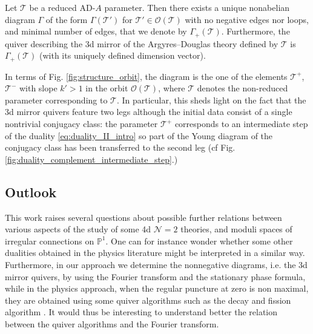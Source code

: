 \documentclass[11pt,a4paper]{amsart}
\numberwithin{equation}{section}
\begin{document}
\begin{theorem} Let $\mathscr T$ be a reduced AD-$A$  parameter.  Then there exists a unique nonabelian diagram $\Gamma$ of the form $\Gamma(\mathcal T')$ for $\mathcal T'\in \mathcal O(\mathscr T)$ with no negative edges nor loops, and minimal number of edges, that we denote by $\Gamma_+(\mathscr T)$. Furthermore, the quiver describing the 3d mirror of the Argyres--Douglas theory defined by $\mathscr T$ is $\Gamma_+(\mathscr T)$ (with its uniquely defined dimension vector).
\end{theorem}

In terms of Fig. \ref{fig:structure_orbit}, the diagram is the one of the elements $\mathcal T^+$, $\mathcal T^-$ with slope $k'>1$ in the orbit $\mathcal O(\mathcal T)$, where $\mathcal T$ denotes the non-reduced parameter corresponding to $\mathscr T$. In particular, this sheds light on the fact that the 3d mirror quivers feature two legs although the initial data consist of a single nontrivial conjugacy class: the parameter $\mathcal T^+$ corresponds to an intermediate step of the duality  \eqref{eq:duality_II_intro} so part of the Young diagram of the conjugacy class has been transferred to the second leg (cf Fig. \ref{fig:duality_complement_intermediate_step}.)



\subsection*{Outlook} This work raises several questions about possible further relations between various aspects of the study of some 4d $\mathcal N=2$ theories, and moduli spaces of irregular connections on $\mathbb P^1$. One can for instance wonder whether some other dualities obtained in the physics literature might be interpreted in a similar way. Furthermore, in our approach we determine the nonnegative diagrams, i.e. the 3d mirror quivers, by using the Fourier transform and the stationary phase formula, while in the physics approach, when the regular puncture at zero is non maximal, they are obtained using some quiver algorithms such as the decay and fission algorithm \cite{bourget2024higgs,bourget2024decay}. It would thus be interesting to understand better the relation between the quiver algorithms and the Fourier transform. 
\end{document}
